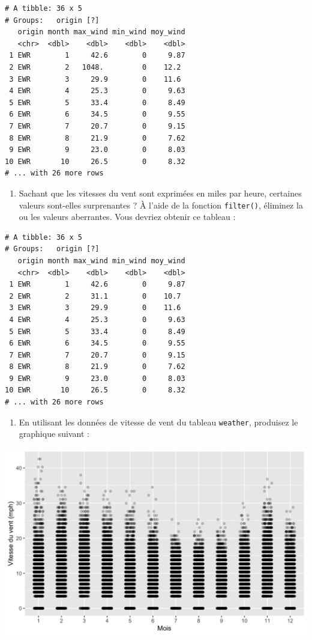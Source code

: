 \documentclass[a4paperpaper,]{article}
\providecommand{\tightlist}{%
  \setlength{\itemsep}{0pt}\setlength{\parskip}{0pt}}
\theoremstyle{definition}
\theoremstyle{definition}
\theoremstyle{definition}
\theoremstyle{remark}
\begin{document}
\begin{verbatim}
# A tibble: 36 x 5
# Groups:   origin [?]
   origin month max_wind min_wind moy_wind
   <chr>  <dbl>    <dbl>    <dbl>    <dbl>
 1 EWR        1     42.6        0     9.87
 2 EWR        2   1048.         0    12.2 
 3 EWR        3     29.9        0    11.6 
 4 EWR        4     25.3        0     9.63
 5 EWR        5     33.4        0     8.49
 6 EWR        6     34.5        0     9.55
 7 EWR        7     20.7        0     9.15
 8 EWR        8     21.9        0     7.62
 9 EWR        9     23.0        0     8.03
10 EWR       10     26.5        0     8.32
# ... with 26 more rows
\end{verbatim}

\begin{enumerate}
\def\labelenumi{\arabic{enumi}.}
\setcounter{enumi}{2}
\tightlist
\item
  Sachant que les vitesses du vent sont exprimées en miles par heure,
  certaines valeurs sont-elles surprenantes ? À l'aide de la fonction
  \texttt{filter()}, éliminez la ou les valeurs aberrantes. Vous devriez
  obtenir ce tableau :
\end{enumerate}

\begin{verbatim}
# A tibble: 36 x 5
# Groups:   origin [?]
   origin month max_wind min_wind moy_wind
   <chr>  <dbl>    <dbl>    <dbl>    <dbl>
 1 EWR        1     42.6        0     9.87
 2 EWR        2     31.1        0    10.7 
 3 EWR        3     29.9        0    11.6 
 4 EWR        4     25.3        0     9.63
 5 EWR        5     33.4        0     8.49
 6 EWR        6     34.5        0     9.55
 7 EWR        7     20.7        0     9.15
 8 EWR        8     21.9        0     7.62
 9 EWR        9     23.0        0     8.03
10 EWR       10     26.5        0     8.32
# ... with 26 more rows
\end{verbatim}

\begin{enumerate}
\def\labelenumi{\arabic{enumi}.}
\setcounter{enumi}{3}
\tightlist
\item
  En utilisant les données de vitesse de vent du tableau
  \texttt{weather}, produisez le graphique suivant :
\end{enumerate}

\begin{center}\includegraphics[width=0.9\linewidth]{figure/windspeed-1} \end{center}
\end{document}
